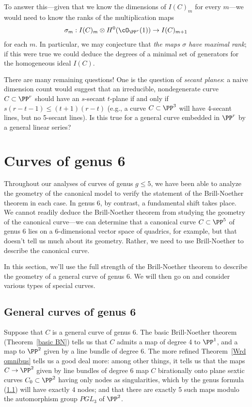 To answer this---given that we know the dimensions of $I(C)_m$ for every $m$---we would need to know the ranks of the multiplication maps
$$
\sigma_m : I(C)_m \otimes H^0(\cO_{\PP^r}(1)) \to I(C)_{m+1}
$$
for each $m$. In particular, we may conjecture that \emph{the maps $\sigma$ have maximal rank}; if this were true we could deduce the degrees of a minimal set of generators for the homogeneous ideal $I(C)$.


There are many remaining questions! One is the question of \emph{secant planes}: a naive dimension count would suggest that an irreducible, nondegenerate curve $C \subset \PP^r$ should have an $s$-secant $t$-plane if and only if $s(r-t-1) \leq (t+1)(r-t)$
(e.g., a curve $C \subset \PP^3$ will have 4-secant lines, but no 5-secant lines). Is this true for a general curve embedded in $\PP^r$ by a general linear series?



\section{Curves of genus 6}\label{genus 6 section}


Throughout our analyses of curves of genus $g \leq 5$, we have been able to analyze the geometry of the canonical model to verify the statement of the Brill-Noether theorem in each case. In genus 6, by contrast, a fundamental shift takes place. We cannot readily deduce the Brill-Noether theorem from studying the geometry of the canonical curve---we can determine that a canonical curve $C \subset \PP^5$ of genus 6 lies on a 6-dimensional vector space of quadrics, for example, but that doesn't tell us much about its geometry. Rather, we need to use Brill-Noether to describe the canonical curve. 

In this section, we'll use the full strength of the Brill-Noether theorem to describe the geometry of a general curve of genus 6. We will then go on and consider various types of special curves.

\subsection{General curves of genus 6}

Suppose that $C$ is a general curve of genus 6. The basic Brill-Noether theorem (Theorem~\ref{basic BN}) tells us that $C$ admits a map of degree 4 to $\PP^1$, and a map to $\PP^2$ given by a line bundle of degree 6. The more refined Theorem~\ref{Wrd omnibus} tells us a good deal more: among other things, it tells us that the maps $C \to \PP^2$ given by line bundles of degree 6 map $C$ birationally onto plane sextic curves $C_0 \subset \PP^2$ having only nodes as singularities, which by the genus formula (\ref{}) will have exactly 4 nodes; and that there are exactly 5 such maps modulo the automorphism group $PGL_3$ of $\PP^2$.

